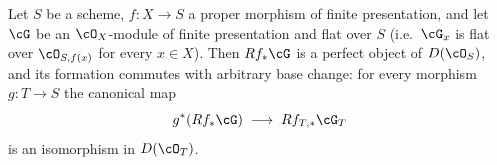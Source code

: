 \begin{lemma}
\label{lem:pc-rf-perfect-base-change}
Let $S$ be a scheme, $f:X\to S$ a proper morphism of finite
presentation, and let $\cG$ be an $\cO_X$-module of finite presentation
and flat over $S$ (i.e.\ $\cG_x$ is flat over $\cO_{S,f(x)}$ for every
$x\in X$).  Then $Rf_*\cG$ is a perfect object of $D(\cO_S)$,
and its formation commutes with arbitrary base change: for every
morphism $g:T\to S$ the canonical map
\[
g^*(Rf_*\cG)\;\longrightarrow\;Rf_{T,*}\cG_T
\]
is an isomorphism in $D(\cO_T)$.
\end{lemma}
